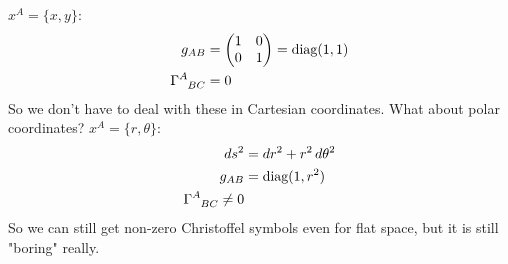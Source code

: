 \documentclass[a4paper, 11pt, normalem]{report}
\begin{document}
\begin{example}
    $x^A = \{x,y\}$:
    \begin{align}
        g_{AB} &= \begin{pmatrix} 1 & 0 \\ 0 & 1 \end{pmatrix} = \text{diag}(1,1) \\
        \tensor{\Gamma}{^A_{BC}} &= 0
    \end{align}
    So we don't have to deal with these in Cartesian coordinates. What about polar coordinates? $x^A = \{r,\theta\}$:
    \begin{align}
        ds^2 &= dr^2 + r^2\,d\theta^2 \\
        g_{AB} &= \text{diag}(1,r^2) \\
        \tensor{\Gamma}{^A_{BC}} \neq 0
    \end{align}
    So we can still get non-zero Christoffel symbols even for flat space, but it is still "boring" really.
\end{example}
\end{document}
